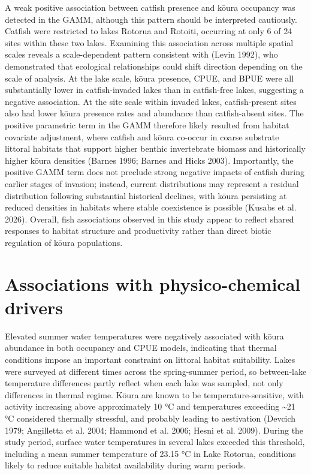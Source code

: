 \documentclass[
  12pt,
  a4paper,
]{scrbook}
\begin{document}
A weak positive association between catfish presence and kōura occupancy
was detected in the GAMM, although this pattern should be interpreted
cautiously. Catfish were restricted to lakes Rotorua and Rotoiti,
occurring at only 6 of 24 sites within these two lakes. Examining this
association across multiple spatial scales reveals a scale-dependent
pattern consistent with (Levin 1992), who demonstrated that ecological
relationships could shift direction depending on the scale of analysis.
At the lake scale, kōura presence, CPUE, and BPUE were all substantially
lower in catfish-invaded lakes than in catfish-free lakes, suggesting a
negative association. At the site scale within invaded lakes,
catfish-present sites also had lower kōura presence rates and abundance
than catfish-absent sites. The positive parametric term in the GAMM
therefore likely resulted from habitat covariate adjustment, where
catfish and kōura co-occur in coarse substrate littoral habitats that
support higher benthic invertebrate biomass and historically higher
kōura densities (Barnes 1996; Barnes and Hicks 2003). Importantly, the
positive GAMM term does not preclude strong negative impacts of catfish
during earlier stages of invasion; instead, current distributions may
represent a residual distribution following substantial historical
declines, with kōura persisting at reduced densities in habitats where
stable coexistence is possible (Kusabs et al. 2026). Overall, fish
associations observed in this study appear to reflect shared responses
to habitat structure and productivity rather than direct biotic
regulation of kōura populations.

\section{Associations with physico-chemical
drivers}\label{associations-with-physico-chemical-drivers}

Elevated summer water temperatures were negatively associated with kōura
abundance in both occupancy and CPUE models, indicating that thermal
conditions impose an important constraint on littoral habitat
suitability. Lakes were surveyed at different times across the
spring-summer period, so between-lake temperature differences partly
reflect when each lake was sampled, not only differences in thermal
regime. Kōura are known to be temperature-sensitive, with activity
increasing above approximately 10 °C and temperatures exceeding
\textasciitilde21 °C considered thermally stressful, and probably
leading to aestivation (Devcich 1979; Angilletta et al. 2004; Hammond et
al. 2006; Hesni et al. 2009). During the study period, surface water
temperatures in several lakes exceeded this threshold, including a mean
summer temperature of 23.15 °C in Lake Rotorua, conditions likely to
reduce suitable habitat availability during warm periods.
\end{document}
